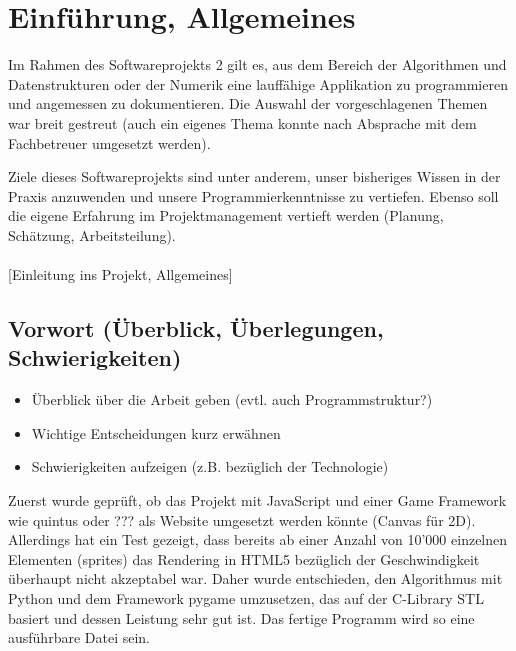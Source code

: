 
\chapter{Einführung, Allgemeines}

Im Rahmen des Softwareprojekts 2 gilt es, aus dem Bereich der Algorithmen und Datenstrukturen oder der Numerik eine lauffähige Applikation zu programmieren und angemessen zu dokumentieren. Die Auswahl der vorgeschlagenen Themen war breit gestreut (auch ein eigenes Thema konnte nach Absprache mit dem Fachbetreuer umgesetzt werden).

Ziele dieses Softwareprojekts sind unter anderem, unser bisheriges Wissen in der Praxis anzuwenden und unsere Programmierkenntnisse zu vertiefen. Ebenso soll die eigene Erfahrung im   Projektmanagement vertieft werden (Planung, Schätzung, Arbeitsteilung). \\\\





[Einleitung ins Projekt, Allgemeines]

\vspace*{1cm}




\section{Vorwort (Überblick, Überlegungen, Schwierigkeiten)}

\begin{itemize}[noitemsep]
\item Überblick über die Arbeit geben (evtl. auch Programmstruktur?)
\item Wichtige Entscheidungen kurz erwähnen
\item Schwierigkeiten aufzeigen (z.B. bezüglich der Technologie)
\end{itemize}


Zuerst wurde geprüft, ob das Projekt mit JavaScript und einer Game Framework wie quintus oder ??? als Website umgesetzt werden könnte (Canvas für 2D). Allerdings hat ein Test gezeigt, dass bereits ab einer Anzahl von 10'000 einzelnen Elementen (sprites) das Rendering in HTML5 bezüglich der Geschwindigkeit überhaupt nicht akzeptabel war. Daher wurde entschieden, den Algorithmus mit Python und dem Framework pygame umzusetzen, das auf der C-Library STL basiert und dessen Leistung sehr gut ist. Das fertige Programm wird so eine ausführbare Datei sein.

